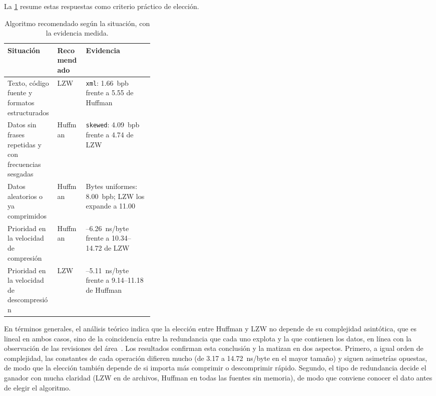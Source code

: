 La \cref{tab:recomendacion} resume estas respuestas como criterio práctico de elección.

\begin{table}[H]
  \centering
  \caption{Algoritmo recomendado según la situación, con la evidencia medida.}
  \label{tab:recomendacion}
  \small
  \begin{tabularx}{\linewidth}{@{}>{\raggedright\arraybackslash}p{0.34\linewidth} l >{\raggedright\arraybackslash}X@{}}
    \toprule
    Situación & Recomendado & Evidencia \\
    \midrule
    Texto, código fuente y formatos estructurados & LZW &
      \texttt{xml}: 1.66~bpb frente a 5.55 de Huffman \\
    Datos sin frases repetidas y con frecuencias sesgadas & Huffman &
      \texttt{skewed}: 4.09~bpb frente a 4.74 de LZW \\
    Datos aleatorios o ya comprimidos & Huffman &
      Bytes uniformes: 8.00~bpb; LZW los expande a 11.00 \\
    Prioridad en la velocidad de compresión & Huffman &
      4.50--6.26~ns/byte frente a 10.34--14.72 de LZW \\
    Prioridad en la velocidad de descompresión & LZW &
      3.17--5.11~ns/byte frente a 9.14--11.18 de Huffman \\
    \bottomrule
  \end{tabularx}
\end{table}

En términos generales, el análisis teórico indica que la elección entre Huffman y LZW no
depende de su complejidad asintótica, que es lineal en ambos casos, sino de la coincidencia
entre la redundancia que cada uno explota y la que contienen los datos, en línea con la
observación de las revisiones del área~\cite{bell1989,jayasankar2021}.
Los resultados confirman esta conclusión y la matizan en dos aspectos. Primero, a igual orden
de complejidad, las constantes de cada operación difieren mucho (de 3.17 a 14.72~ns/byte en
el mayor tamaño) y siguen asimetrías opuestas, de modo que la elección también depende de si importa más comprimir o
descomprimir rápido. Segundo, el tipo de redundancia decide el ganador con mucha claridad
(LZW en \resLzwWins{} de \resCorpusFiles{} archivos, Huffman en todas las fuentes sin
memoria), de modo que conviene conocer el dato antes de elegir el algoritmo.
